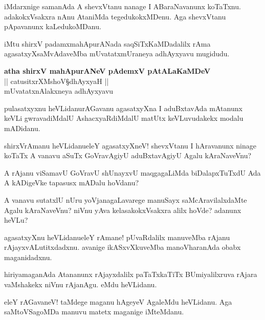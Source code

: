 \begin{mng}
iMdarxnige samanAda A shevxVtanu nanage I ABaraNavanunx koTaTxnu. adakokxVsakxra nAnu AtaniMda tegedukokxMDenu. Aga shevxVtanu pApavanunx kaLedukoMDanu.
\end{mng}
iMtu shirxV padamxmahApurANada saqSiTxKaMDadalilx rAma agasatxyXsaMvAdaveMba mUvatatxmUraneya adhAyxyavu mugidudu.

\begin{center}
\textbf{\Large atha shirxV mahApurANeV pAdemxV pAtALaKaMDeV}\\
|| catusitxrXMshoV\S dhAyxyaH ||\\[20pt]
mUvatatxnAlakxneya adhAyxyavu
\end{center}

\begin{mng}
pulasatxyxnu heVLidanu\mdash rAGavanu agasatxyXna I aduBxtavAda mAtanunx keVLi gwravadiMdalU AshacxyaRdiMdalU matUtx keVLuvudakekx modalu mADidanu.
\end{mng}

\begin{mng}
shirxVrAmanu heVLidanu\mdash eleY agasatxyXneV! shevxVtanu I hAravanunx ninage koTaTx A vanavu aSuTx GoVravAgiyU aduBxtavAgiyU Agalu kAraNaveVnu?
\end{mng}

\begin{mng}
A rAjanu viSamavU GoVravU shUnayxvU maqgagaLiMda biDalapxTuTxdU Ada A kADigeVke tapasusx mADalu hoVdanu?
\end{mng}

\begin{mng}
A vanavu sutatxlU nUru yoVjanagaLavarege manuSayx saMcAravilalxdaMte Agalu kAraNaveVnu? niVnu yAva kelasakokxVsakxra alilx hoVde? adanunx heVLu?
\end{mng}

\begin{mng}
agasatxyXnu heVLidanu\mdash eleY rAmane! pUvaRdalilx manuveMba rAjanu rAjayxvALutitxdadxnu. avanige ikASxvXkuveMba manoVharanAda obabx maganidadxnu.
\end{mng}

\begin{mng}
hiriyamaganAda Atananunx rAjayxdalilx paTaTxkaTiTx BUmiyalilxruva rAjara vaMshakekx niVnu rAjanAgu. eMdu heVLidanu.
\end{mng}

\begin{mng}
eleY rAGavaneV! taMdege maganu hAgeyeV AgaleMdu heVLidanu. Aga saMtoVSagoMDa manuvu matetx maganige iMteMdanu.
\end{mng}


